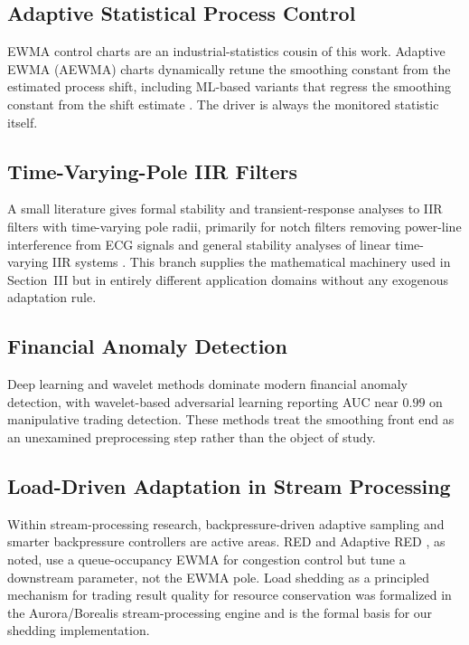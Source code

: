 \documentclass[conference]{IEEEtran}
\begin{document}
\subsection{Adaptive Statistical Process Control}
EWMA control charts are an industrial-statistics cousin of this work.
Adaptive EWMA (AEWMA) charts dynamically retune the smoothing constant from
the estimated process shift, including ML-based variants that regress the
smoothing constant from the shift estimate \cite{aewma1, aewma2}. The driver
is always the monitored statistic itself.

\subsection{Time-Varying-Pole IIR Filters}
A small literature gives formal stability and transient-response analyses to
IIR filters with time-varying pole radii, primarily for notch filters
removing power-line interference from ECG signals \cite{tvnotch} and general
stability analyses of linear time-varying IIR systems \cite{tviir}. This
branch supplies the mathematical machinery used in Section~III but in
entirely different application domains without any exogenous adaptation rule.

\subsection{Financial Anomaly Detection}
Deep learning \cite{waldata} and wavelet methods dominate modern financial
anomaly detection, with wavelet-based adversarial learning reporting AUC
near $0.99$ on manipulative trading detection. These methods treat the
smoothing front end as an unexamined preprocessing step rather than the
object of study.

\subsection{Load-Driven Adaptation in Stream Processing}
Within stream-processing research, backpressure-driven adaptive sampling
\cite{aswb} and smarter backpressure controllers \cite{governor} are active
areas. RED and Adaptive RED \cite{red, ared}, as noted, use a queue-occupancy
EWMA for congestion control but tune a downstream parameter, not the EWMA
pole. Load shedding as a principled mechanism for trading result quality for
resource conservation was formalized in the Aurora/Borealis stream-processing
engine \cite{loadsheddingtatbul} and is the formal basis for our shedding
implementation.
\end{document}
